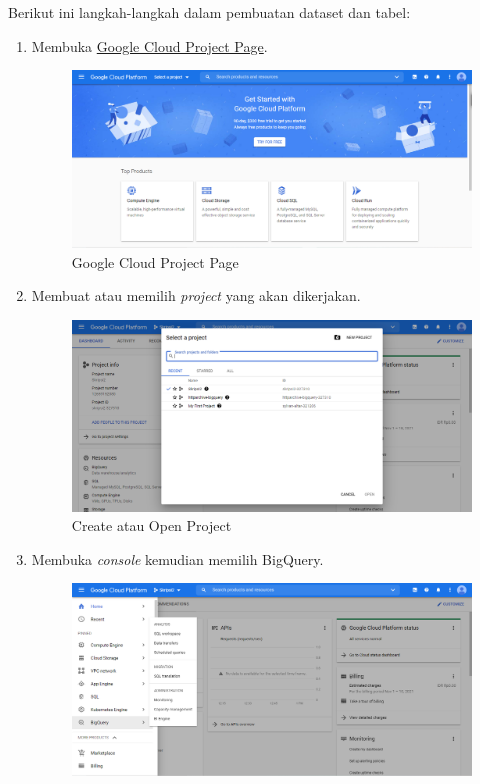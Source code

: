 Berikut ini langkah-langkah dalam pembuatan dataset dan tabel:
\begin{enumerate}
	\item Membuka \href{https://console.cloud.google.com/getting-started}{Google Cloud Project Page}.
	\begin{figure}[H]
		\centering  
		\includegraphics[scale=0.5]{Gambar/open_GCP.PNG}  
		\caption{Google Cloud Project Page} 
		\label{fig:GCP} 
	\end{figure}
	\item Membuat atau memilih \textit{project} yang akan dikerjakan.
	\begin{figure}[H]
		\centering  
		\includegraphics[scale=0.5]{Gambar/pilih_project.PNG}  
		\caption{Create atau Open Project} 
		\label{fig:create_or_open} 
	\end{figure}
	\item Membuka \textit{console} kemudian memilih BigQuery.
	\begin{figure}[H]
		\centering  
		\includegraphics[scale=0.5]{Gambar/console_BigQuery.PNG}  

\end{figure}
\end{enumerate}
